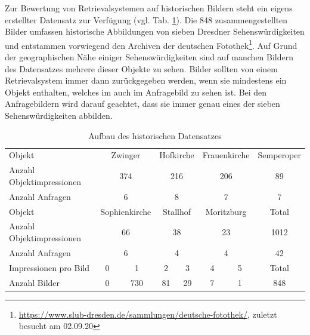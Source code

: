 Zur Bewertung von Retrievalsystemen auf historischen Bildern steht ein eigens erstellter Datensatz zur Verfügung (vgl. Tab. \ref{hist4d_data}). Die 848 zusammengestellten Bilder umfassen historische Abbildungen von sieben Dresdner Sehenswürdigkeiten und entstammen vorwiegend den Archiven der deutschen Fotothek\footnote{\url{https://www.slub-dresden.de/sammlungen/deutsche-fotothek/}, zuletzt besucht am 02.09.20}. Auf Grund der geographischen Nähe einiger Sehenswürdigkeiten sind auf manchen Bildern des Datensatzes mehrere dieser Objekte zu sehen. Bilder sollten von einem Retrievalsystem immer dann zurückgegeben werden, wenn sie mindestens ein Objekt enthalten, welches im auch im Anfragebild zu sehen ist. Bei den Anfragebildern wird darauf geachtet, dass sie immer genau eines der sieben Sehenswürdigkeiten abbilden.
\\
\begin{table}[h]
\centering

\begin{tabular}{l|c|c|c|c|c|c|c}
\rowcolor[HTML]{C0C0C0} 
Objekt &
  \multicolumn{2}{c|}{\cellcolor[HTML]{C0C0C0}Zwinger} &
  \multicolumn{2}{c|}{\cellcolor[HTML]{C0C0C0}Hofkirche} &
  \multicolumn{2}{c|}{\cellcolor[HTML]{C0C0C0}Frauenkirche} &
  Semperoper \\
Anzahl Objektimpressionen & \multicolumn{2}{c|}{374} & \multicolumn{2}{c|}{216} & \multicolumn{2}{c|}{206} & 89    \\
Anzahl Anfragen           & \multicolumn{2}{c|}{6}   & \multicolumn{2}{c|}{8}   & \multicolumn{2}{c|}{7}   & 7     \\ \hline
\rowcolor[HTML]{C0C0C0} 
Objekt &
  \multicolumn{2}{c|}{\cellcolor[HTML]{C0C0C0}Sophienkirche} &
  \multicolumn{2}{c|}{\cellcolor[HTML]{C0C0C0}Stallhof} &
  \multicolumn{2}{c|}{\cellcolor[HTML]{C0C0C0}Moritzburg} &
  Total \\
Anzahl Objektimpressionen & \multicolumn{2}{c|}{66}  & \multicolumn{2}{c|}{38}  & \multicolumn{2}{c|}{23}  & 1012  \\
Anzahl Anfragen           & \multicolumn{2}{c|}{6}   & \multicolumn{2}{c|}{4}   & \multicolumn{2}{c|}{4}   & 42    \\ \hline
\rowcolor[HTML]{C0C0C0} 
Impressionen pro Bild     & \hspace{2.5mm} 0 \hspace{2.5mm}         & 1           & \hspace{1.1mm} 2 \hspace{1.1mm}           & 3          & \hspace{2mm} 4 \hspace{2mm}           & 5          & Total \\
Anzahl Bilder             & 0          & 730         & 81          & 29         & 7           & 1          & 848  
\end{tabular}%

\caption{Aufbau des historischen Datensatzes}
\label{hist4d_data}
\end{table}
